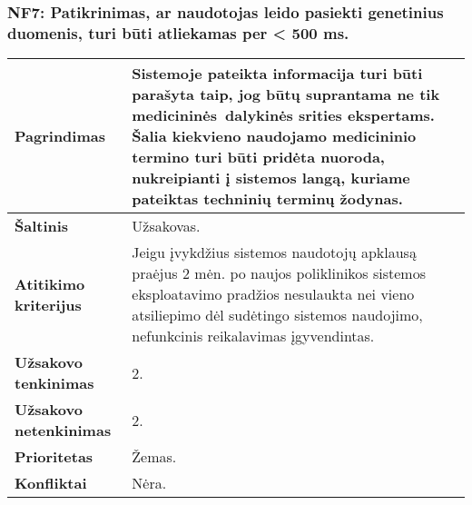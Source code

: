 \documentclass[12pt]{article}
\begin{document}
\subsubsection*{NF7: Patikrinimas, ar naudotojas leido pasiekti genetinius
duomenis, turi būti atliekamas per < 500 ms.}
\label{sec:NF7}
\begin{table}[htb!]
    \captionsetup{justification=centering}
    \begin{tabular}{|m{4.9cm}|m{11cm}|}
        \hline
        \raggedleft \textbf{\cellcolor{orange!30}Pagrindimas} &
        Sistemoje pateikta informacija turi būti parašyta taip, jog būtų
        suprantama ne tik medicininės dalykinės srities ekspertams. Šalia
        kiekvieno naudojamo medicininio termino turi būti pridėta nuoroda,
        nukreipianti į sistemos langą, kuriame pateiktas techninių terminų
        žodynas. \\
        \hline
        \raggedleft \textbf{\cellcolor{orange!30}Šaltinis} & Užsakovas. \\
        \hline
        \raggedleft \textbf{\cellcolor{orange!30}Atitikimo kriterijus} & 
        Jeigu įvykdžius sistemos naudotojų apklausą praėjus 2 mėn. po naujos
        poliklinikos sistemos eksploatavimo pradžios nesulaukta nei vieno
        atsiliepimo dėl sudėtingo sistemos naudojimo, nefunkcinis reikalavimas
        įgyvendintas. \\
        \hline
        \raggedleft \textbf{\cellcolor{orange!30}Užsakovo tenkinimas} & 2. \\
        \hline
        \raggedleft \textbf{\cellcolor{orange!30}Užsakovo netenkinimas} & 2. \\
        \hline
        \raggedleft \textbf{\cellcolor{orange!30}Prioritetas} & Žemas. \\
        \hline
        \raggedleft \textbf{\cellcolor{orange!30}Konfliktai} & Nėra. \\
        \hline
    \end{tabular}
\end{table}


\end{document}

